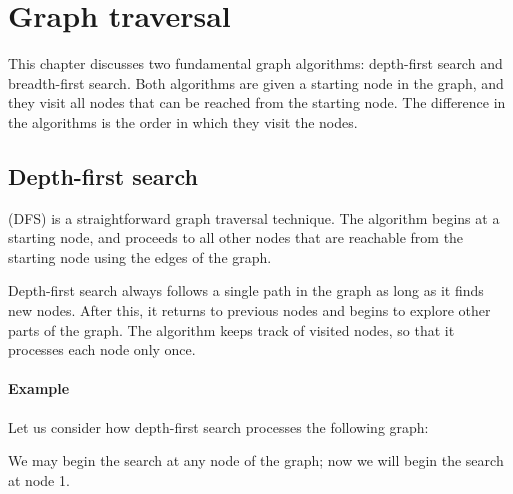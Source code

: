 \chapter{Graph traversal}

This chapter discusses two fundamental
graph algorithms:
depth-first search and breadth-first search.
Both algorithms are given a starting
node in the graph,
and they visit all nodes that can be reached
from the starting node.
The difference in the algorithms is the order
in which they visit the nodes.

\section{Depth-first search}


 (DFS)
is a straightforward graph traversal technique.
The algorithm begins at a starting node,
and proceeds to all other nodes that are
reachable from the starting node using
the edges of the graph.

Depth-first search always follows a single
path in the graph as long as it finds
new nodes.
After this, it returns to previous
nodes and begins to explore other parts of the graph.
The algorithm keeps track of visited nodes,
so that it processes each node only once.

\subsubsection*{Example}

Let us consider how depth-first search processes
the following graph:
\begin{center}
\end{center}
We may begin the search at any node of the graph;
now we will begin the search at node 1.

